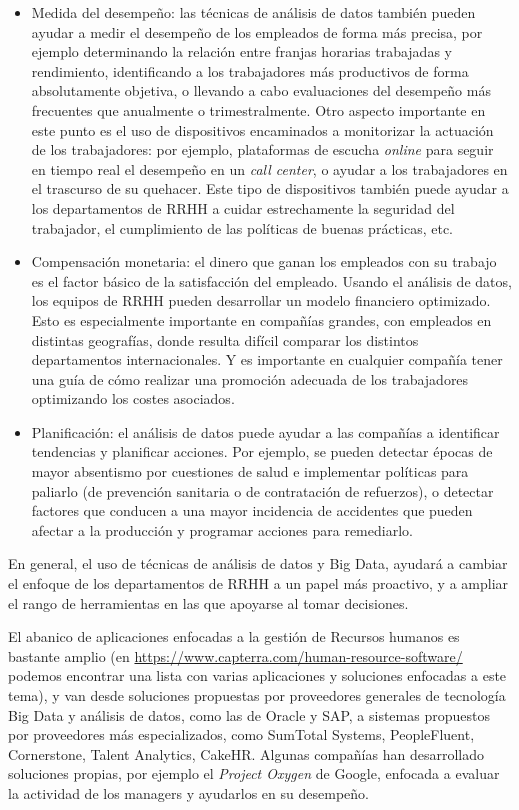 \begin{itemize}
\item Medida del desempeño: las técnicas de análisis de datos también pueden ayudar a medir
el desempeño de los empleados de forma más precisa, por ejemplo determinando la relación entre 
franjas horarias trabajadas y rendimiento, identificando a los trabajadores más productivos de
forma absolutamente objetiva, o llevando a cabo evaluaciones del desempeño
más frecuentes que anualmente o trimestralmente. Otro aspecto importante en este punto es el uso de dispositivos 
encaminados a monitorizar la actuación de los trabajadores: por ejemplo, plataformas de escucha 
{\em online} para seguir en tiempo real el desempeño en un {\em call center}, o ayudar a los trabajadores
en el trascurso de su quehacer. Este tipo de dispositivos también puede ayudar a los departamentos
de RRHH a cuidar estrechamente la seguridad del trabajador, el cumplimiento de las políticas
de buenas prácticas, etc.

\item Compensación monetaria: el dinero que ganan los empleados con su trabajo es el
factor básico de la satisfacción del empleado. Usando el análisis de datos, los equipos de 
RRHH pueden desarrollar un modelo financiero optimizado. Esto es especialmente importante
en compañías grandes, con empleados en distintas geografías, donde resulta difícil comparar 
los distintos departamentos internacionales. Y es importante en cualquier compañía tener
una guía de cómo realizar una promoción adecuada de los trabajadores optimizando
los costes asociados.

\item Planificación: el análisis de datos puede ayudar a las compañías a identificar tendencias y 
planificar acciones. Por ejemplo, se pueden detectar épocas de mayor absentismo por cuestiones de 
salud e implementar políticas para paliarlo (de prevención sanitaria o de contratación de refuerzos), o 
detectar factores que conducen a una mayor incidencia de accidentes que pueden afectar a la producción
y programar acciones para remediarlo.

\end{itemize}

En general, el uso de técnicas de análisis de datos y Big Data, ayudará a cambiar el enfoque
de los departamentos de RRHH a un papel más proactivo, y a ampliar el rango de herramientas en las
que apoyarse al tomar decisiones.

El abanico de aplicaciones enfocadas a la gestión de Recursos humanos es bastante amplio
(en \url{https://www.capterra.com/human-resource-software/ } podemos encontrar una lista con
varias aplicaciones y soluciones enfocadas a este tema), y van desde soluciones propuestas
por proveedores generales de tecnología Big Data y análisis de datos,
como las de Oracle y SAP, a sistemas propuestos por proveedores más especializados, 
como SumTotal Systems, PeopleFluent, Cornerstone, Talent Analytics, CakeHR.
Algunas compañías han desarrollado soluciones propias,
por ejemplo el {\em Project Oxygen} de Google, enfocada a evaluar la actividad de los managers y 
ayudarlos en su desempeño.

